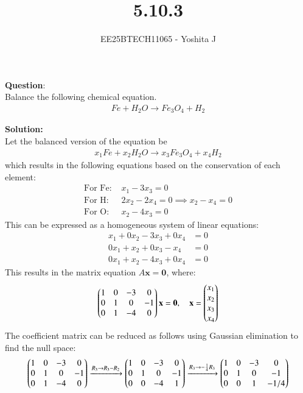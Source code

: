 \documentclass[journal]{IEEEtran}
\begin{document}

\vspace{3cm}

\title{5.10.3}
\author{EE25BTECH11065 - Yoshita J}
{\let\newpage\relax\maketitle}

\renewcommand{\thefigure}{\theenumi}
\renewcommand{\thetable}{\theenumi}
\setlength{\intextsep}{10pt}

\textbf{Question}:\\
Balance the following chemical equation.
\begin{align*}
    Fe + H_2O \to Fe_3O_4 + H_2
\end{align*}
\bigskip

\textbf{Solution:} \\
Let the balanced version of the equation be
\begin{align}
    x_1 Fe + x_2 H_2O \to x_3 Fe_3O_4 + x_4 H_2
\end{align}
which results in the following equations based on the conservation of each element:
\begin{align}
    \text{For Fe: } &x_1 - 3x_3 = 0 \\
    \text{For H: } &2x_2 - 2x_4 = 0 \implies x_2 - x_4 = 0 \\
    \text{For O: } &x_2 - 4x_3 = 0
\end{align}
This can be expressed as a homogeneous system of linear equations:
\begin{align}
    x_1 + 0x_2 - 3x_3 + 0x_4 &= 0 \\
    0x_1 + x_2 + 0x_3 - x_4 &= 0 \\
    0x_1 + x_2 - 4x_3 + 0x_4 &= 0
\end{align}
This results in the matrix equation $A\mathbf{x} = \mathbf{0}$, where:
\begin{align}
    \begin{pmatrix}
        1 & 0 & -3 & 0 \\
        0 & 1 & 0 & -1 \\
        0 & 1 & -4 & 0
    \end{pmatrix} \mathbf{x} = \mathbf{0},
    \quad \mathbf{x} = \begin{pmatrix} x_1 \\ x_2 \\ x_3 \\ x_4 \end{pmatrix}
\end{align}
The coefficient matrix can be reduced as follows using Gaussian elimination to find the null space:
\begin{align*}
\begin{pmatrix}
1 & 0 & -3 & 0 \\
0 & 1 & 0 & -1 \\
0 & 1 & -4 & 0
\end{pmatrix}
\xrightarrow{R_3 \to R_3 - R_2}
\begin{pmatrix}
1 & 0 & -3 & 0 \\
0 & 1 & 0 & -1 \\
0 & 0 & -4 & 1
\end{pmatrix}
\xrightarrow{R_3 \to -\frac{1}{4}R_3}
\begin{pmatrix}
1 & 0 & -3 & 0 \\
0 & 1 & 0 & -1 \\
0 & 0 & 1 & -1/4
\end{pmatrix}
\end{align*}
\end{document}
